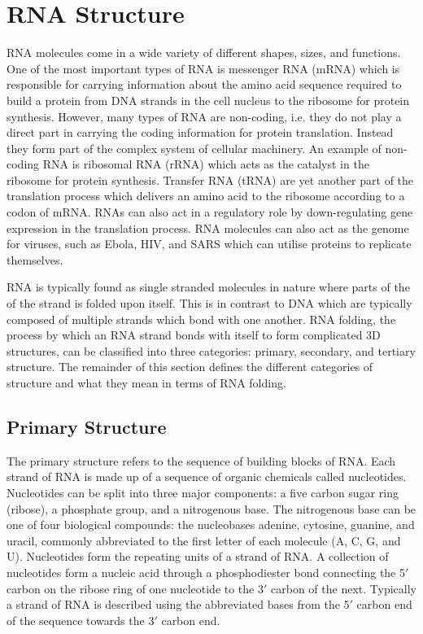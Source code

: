 \documentclass[journal]{IEEEtran}
\begin{document}
\section{RNA Structure}
\label{sec:rna-structure}
RNA molecules come in a wide variety of different shapes, sizes, and functions. One of the most important types of RNA is messenger RNA (mRNA) which is responsible for carrying information about the amino acid sequence required to build a protein from DNA strands in the cell nucleus to the ribosome for protein synthesis. However, many types of RNA are non-coding, i.e. they do not play a direct part in carrying the coding information for protein translation. Instead they form part of the complex system of cellular machinery. An example of non-coding RNA is ribosomal RNA (rRNA) \cite{yusupov2001crystal} which acts as the catalyst in the ribosome for protein synthesis. Transfer RNA (tRNA) \cite{sussman1978crystal, holbrook1978crystal} are yet another part of the translation process which delivers an amino acid to the ribosome according to a codon of mRNA. RNAs can also act in a regulatory role by down-regulating gene expression in the translation process. RNA molecules can also act as the genome for viruses, such as Ebola, HIV, and SARS which can utilise proteins to replicate themselves.

RNA is typically found as single stranded molecules in nature where parts of the of the strand is folded upon itself. This is in contrast to DNA which are typically composed of multiple strands which bond with one another. RNA folding, the process by which an RNA strand bonds with itself to form complicated 3D structures, can be classified into three categories: primary, secondary, and tertiary structure. The remainder of this section defines the different categories of structure and what they mean in terms of RNA folding.

\subsection{Primary Structure}
\label{subsec:primary-structure}

 The primary structure refers to the sequence of building blocks of RNA. Each strand of RNA is made up of a sequence of organic chemicals called nucleotides. Nucleotides can be split into three major components: a five carbon sugar ring (ribose), a phosphate group, and a nitrogenous base. The nitrogenous base can be one of four biological compounds: the nucleobases adenine, cytosine, guanine, and uracil, commonly abbreviated to the first letter of each molecule (A, C, G, and U). Nucleotides form the repeating units of a strand of RNA. A collection of nucleotides form a nucleic acid through a phosphodiester bond connecting the 5$'$ carbon on the ribose ring of one nucleotide to the 3$'$ carbon of the next. Typically a strand of RNA is described using the abbreviated bases from the 5$'$ carbon end of the sequence towards the 3$'$ carbon end.
 
\end{document}
